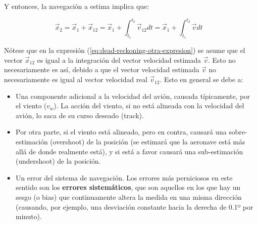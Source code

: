 \documentclass[a4paper,12pt,twoside]{article}
\begin{document}
Y entonces, la navegaci\'on a estima implica que:

\begin{equation}
  \label{eq:dead-reckoning-otra-expresion}
\vec x_2 = \vec x_1 + \vec x_{12} = \vec x_1 + \int_{t_1}^{t_2} \vec v_{12} dt = \vec x_1 + \int_{t_1}^{t_2} \vec v dt   
\end{equation}

N\'otese que en la expresi\'on (\ref{eq:dead-reckoning-otra-expresion}) se asume que el vector $\vec x_{12}$ es igual a la integraci\'on del vector velocidad estimada $\vec v$. Esto no necesariamente es as\'i, debido a que el vector velocidad estimada $\vec v$ no necesariamente es igual al vector velocidad real $\vec v_{12}$. Esto en general se debe a:

\begin{minipage}[b]{0.70\linewidth}
  \begin{itemize}
  \item Una componente adicional a la velocidad del avi\'on, causada
    t\'ipicamente, por el viento ($v_w$). La acci\'on del viento, si
    no est\'a alineada con la velocidad del avi\'on, lo saca de su
    curso deseado (track).

  \item Por otra parte, si el viento est\'a alineado, pero en contra,
    causar\'a una sobre-estimaci\'on (overshoot) de la posici\'on (se
    estimar\'a que la aeronave est\'a m\'as all\'a de donde realmente
    est\'a), y si est\'a a favor causar\'a una sub-estimaci\'on
    (undershoot) de la posici\'on.

  \item Un error del sistema de navegaci\'on. Los errores m\'as
    perniciosos en este sentido son los \textbf{errores
      sistem\'aticos}, que son aquellos en los que hay un sesgo (o
    bias) que continuamente altera la medida en una misma direcci\'on
    (causando, por ejemplo, una desviaci\'on constante hacia la
    derecha de 0.1º por minuto).

  \end{itemize}
\end{minipage}
\end{document}
